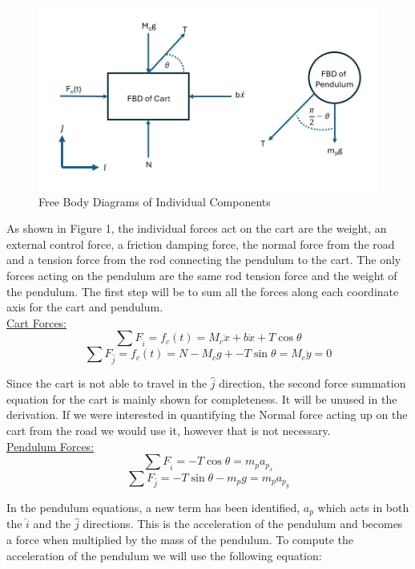 \documentclass[titlepage]{article}
\begin{document}
\begin{figure}[H]
\center
\includegraphics[width=1\linewidth]{free_body_diagram.png}
\caption{Free Body Diagrams of Individual Components}
\end{figure}

As shown in Figure 1, the individual forces act on the cart are the weight, an external control force, a friction damping force, the normal force from the road and a tension force from the rod connecting the pendulum to the cart. The only forces acting on the pendulum are the same rod tension force and the weight of the pendulum. The first step will be to sum all the forces along each coordinate axis for the cart and pendulum.\\

\underline{Cart Forces:}
\begin{equation}
\sum{}{F_{\hat{i}}} = f_{c}\left(t\right) = M_{c}\ddot{x} + b\dot{x} + T\cos{\theta}
\end{equation}
\[ \sum{}{F_{\hat{j}}} = f_{c}\left(t\right) = N - M_{c}g + - T\sin{\theta} = M_{c}\ddot{y}=0 \]

Since the cart is not able to travel in the \(\hat{j}\) direction, the second force summation equation for the cart is mainly shown for completeness. It will be unused in the derivation. If we were interested in quantifying the Normal force acting up on the cart from the road we would use it, however that is not necessary.\\

\underline{Pendulum Forces:}
\[ \sum{}{F_{\hat{i}}} = -T\cos{\theta} = m_{p}a_{p_{x}}\]
\[ \sum{}{F_{\hat{j}}} =  -T\sin{\theta} -m_{p}g = m_{p}a_{p_{y}} \]

In the pendulum equations, a new term has been identified, \(a_{p}\) which acts in both the \(\hat{i}\) and the \(\hat{j}\) directions. This is the acceleration of the pendulum and becomes a force when multiplied by the mass of the pendulum. To compute the acceleration of the pendulum we will use the following equation:
\end{document}
